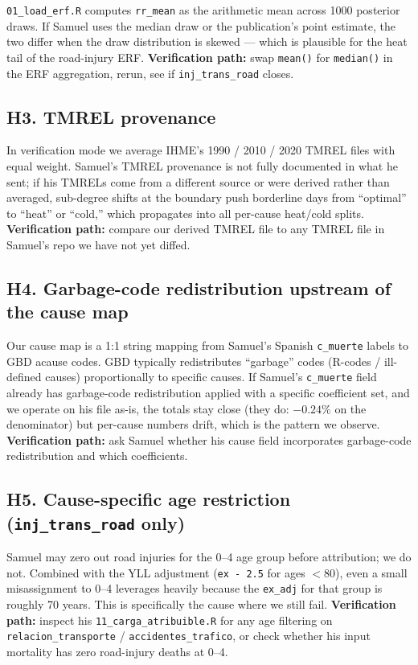 \documentclass[11pt]{article}
\begin{document}
\texttt{01\_load\_erf.R} computes \texttt{rr\_mean} as the arithmetic mean
across 1000 posterior draws. If Samuel uses the median draw or the
publication's point estimate, the two differ when the draw distribution is
skewed --- which is plausible for the heat tail of the road-injury ERF.
\textbf{Verification path:} swap \texttt{mean()} for \texttt{median()} in the
ERF aggregation, rerun, see if \texttt{inj\_trans\_road} closes.

\subsection*{H3. TMREL provenance}

In verification mode we average IHME's 1990 / 2010 / 2020 TMREL files with
equal weight. Samuel's TMREL provenance is not fully documented in what he
sent; if his TMRELs come from a different source or were derived rather than
averaged, sub-degree shifts at the boundary push borderline days from
``optimal'' to ``heat'' or ``cold,'' which propagates into all per-cause
heat/cold splits. \textbf{Verification path:} compare our derived TMREL
file to any TMREL file in Samuel's repo we have not yet diffed.

\subsection*{H4. Garbage-code redistribution upstream of the cause map}

Our cause map is a 1:1 string mapping from Samuel's Spanish
\texttt{c\_muerte} labels to GBD acause codes. GBD typically redistributes
``garbage'' codes (R-codes / ill-defined causes) proportionally to specific
causes. If Samuel's \texttt{c\_muerte} field already has garbage-code
redistribution applied with a specific coefficient set, and we operate on
his file as-is, the totals stay close (they do: $-0.24\%$ on the denominator)
but per-cause numbers drift, which is the pattern we observe. \textbf{Verification path:} ask Samuel whether his cause field
incorporates garbage-code redistribution and which coefficients.

\subsection*{H5. Cause-specific age restriction (\texttt{inj\_trans\_road} only)}

Samuel may zero out road injuries for the 0--4 age group before
attribution; we do not. Combined with the YLL adjustment (\texttt{ex - 2.5}
for ages $<80$), even a small misassignment to 0--4 leverages heavily
because the \texttt{ex\_adj} for that group is roughly 70 years. This is
specifically the cause where we still fail.
\textbf{Verification path:} inspect his
\texttt{11\_carga\_atribuible.R} for any age filtering on
\texttt{relacion\_transporte} / \texttt{accidentes\_trafico}, or check whether his
input mortality has zero road-injury deaths at 0--4.
\end{document}
